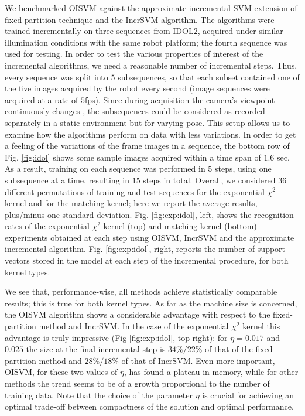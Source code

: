 We benchmarked OISVM against the approximate incremental SVM
extension of fixed-partition technique \cite{SyedLS99} and 
the IncrSVM algorithm. The algorithms were trained incrementally on
three sequences from IDOL2, acquired under similar illumination
conditions with the same robot platform; the fourth sequence was used
for testing. In order to test the various properties of interest of
the incremental algorithms, we need a reasonable number of incremental
steps. Thus, every sequence was split into $5$ subsequences, so that
each subset contained one of the five images acquired by the robot
every second (image sequences were acquired at a rate of
$5$fps). Since during acquisition the camera's viewpoint continuously
changes \cite{luo:icra07}, the subsequences could be considered as
recorded separately in a static environment but for varying pose.
This setup allows us to examine how the algorithms perform on data
with less variations. In order to get a feeling of the variations of
the frame images in a sequence, the bottom row of Fig. \ref{fig:idol}
shows some sample images acquired within a time span of $1.6$
sec. As a result, training on each sequence was
performed in $5$ steps, using one subsequence at a time, resulting in
$15$ steps in total. Overall, we considered $36$ different
permutations of training and test sequences for the exponential
$\chi^2$ kernel and for the matching kernel; here we report the
average results, plus/minus one standard deviation.
Fig. \ref{fig:exp:idol}, left, shows the recognition rates of the
exponential $\chi^2$ kernel (top) and matching kernel (bottom)
experiments obtained at each step using OISVM, IncrSVM and the
approximate incremental algorithm. Fig. \ref{fig:exp:idol}, right,
reports the number of support vectors stored in the model at each step
of the incremental procedure, for both kernel types.

We see that, performance-wise, all methods achieve statistically
comparable results; this is true for both kernel types. As far as the
machine size is concerned, the OISVM algorithm shows a considerable
advantage with respect to the fixed-partition method and IncrSVM. In the case of
the exponential $\chi^{2}$ kernel this advantage is truly impressive
(Fig \ref{fig:exp:idol}, top right): for $\eta=0.017$ and $0.025$ the
size at the final incremental step is $34\%/22\%$ of that of the
fixed-partition method and $28\%/18\%$ of that of IncrSVM.
Even more important, OISVM, for these two values of $\eta$,
has found a plateau in memory, while for other methods the trend seems
to be of a growth proportional to the number of training data. Note
that the choice of the parameter $\eta$ is crucial for achieving an
optimal trade-off between compactness of the solution and optimal
performance.

